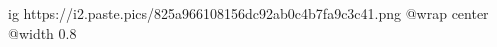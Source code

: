  
 
 
 
 

\ifcmt
  ig https://i2.paste.pics/825a966108156dc92ab0c4b7fa9c3c41.png
  @wrap center
  @width 0.8
\fi
